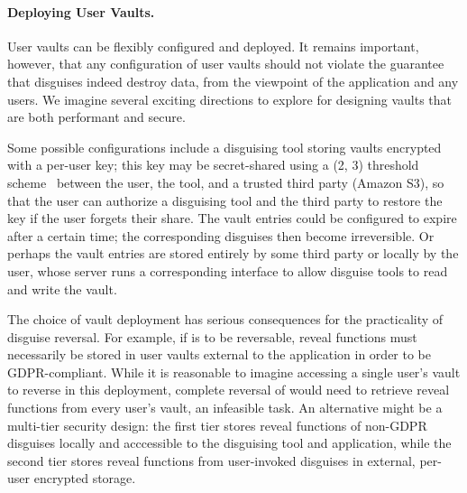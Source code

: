 \paragraph{Deploying User Vaults.}
User vaults can be flexibly configured and deployed. It remains important, however, that any
configuration of user vaults should not violate the guarantee that disguises indeed destroy data,
from the viewpoint of the application and any users.
We imagine several exciting directions to explore for designing vaults that are both
performant and secure.
%

%
Some possible configurations include a disguising tool storing vaults encrypted with a per-user key; this key
may be secret-shared using a (2, 3) threshold scheme~\cite{secretsharing} between the user, the
tool, and a trusted third party (\eg Amazon S3), so that the user can authorize a disguising tool and the
third party to restore the key if the user forgets their share.
%
The vault entries could be configured to expire after a certain time; the corresponding disguises
then become irreversible.
%
Or perhaps the vault entries are stored entirely by some third party or locally by the user, whose
server runs a corresponding interface to allow disguise tools to read and write the vault.

The choice of vault deployment has serious consequences for the practicality of disguise reversal.
For example, if \gdpr is to be reversable, reveal functions must necessarily be stored in user vaults external
to the application in order to be GDPR-compliant.
While it is reasonable to imagine accessing a single user's vault to reverse \gdpr in this
deployment, complete reversal of \ca would need to retrieve reveal functions from every user's vault, an infeasible task.
An alternative might be a multi-tier security design: the first tier stores reveal functions of
non-GDPR disguises locally and acccessible to the disguising tool and application, while the second
tier stores reveal functions from user-invoked disguises in external, per-user encrypted storage.


